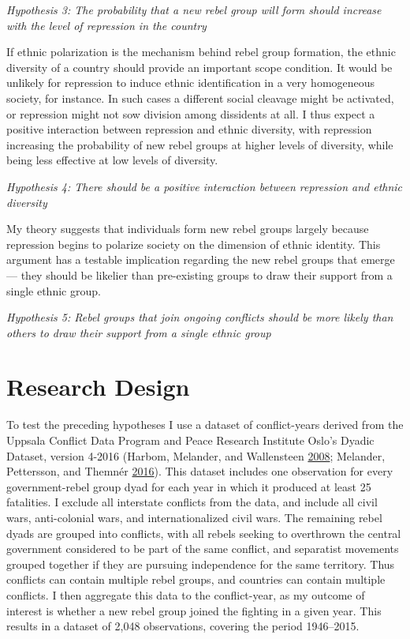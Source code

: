 \documentclass[12pt,]{book}
\theoremstyle{definition}
\theoremstyle{definition}
\theoremstyle{definition}
\theoremstyle{remark}
\begin{document}
\emph{Hypothesis 3: The probability that a new rebel group will form
should increase with the level of repression in the country}

If ethnic polarization is the mechanism behind rebel group formation,
the ethnic diversity of a country should provide an important scope
condition. It would be unlikely for repression to induce ethnic
identification in a very homogeneous society, for instance. In such
cases a different social cleavage might be activated, or repression
might not sow division among dissidents at all. I thus expect a positive
interaction between repression and ethnic diversity, with repression
increasing the probability of new rebel groups at higher levels of
diversity, while being less effective at low levels of diversity.

\emph{Hypothesis 4: There should be a positive interaction between
repression and ethnic diversity}

My theory suggests that individuals form new rebel groups largely
because repression begins to polarize society on the dimension of ethnic
identity. This argument has a testable implication regarding the new
rebel groups that emerge --- they should be likelier than pre-existing
groups to draw their support from a single ethnic group.

\emph{Hypothesis 5: Rebel groups that join ongoing conflicts should be
more likely than others to draw their support from a single ethnic
group}

\hypertarget{research-design-1}{%
\section{Research Design}\label{research-design-1}}

To test the preceding hypotheses I use a dataset of conflict-years
derived from the Uppsala Conflict Data Program and Peace Research
Institute Oslo's Dyadic Dataset, version 4-2016 (Harbom, Melander, and
Wallensteen \protect\hyperlink{ref-Harbom2008}{2008}; Melander,
Pettersson, and Themnér \protect\hyperlink{ref-Melander2016}{2016}).
This dataset includes one observation for every government-rebel group
dyad for each year in which it produced at least 25 fatalities. I
exclude all interstate conflicts from the data, and include all civil
wars, anti-colonial wars, and internationalized civil wars. The
remaining rebel dyads are grouped into conflicts, with all rebels
seeking to overthrown the central government considered to be part of
the same conflict, and separatist movements grouped together if they are
pursuing independence for the same territory. Thus conflicts can contain
multiple rebel groups, and countries can contain multiple conflicts. I
then aggregate this data to the conflict-year, as my outcome of interest
is whether a new rebel group joined the fighting in a given year. This
results in a dataset of 2,048 observations, covering the period
1946--2015.
\end{document}
